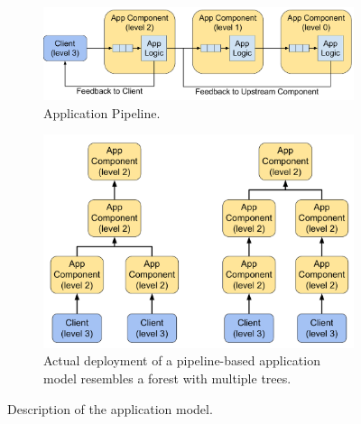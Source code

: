 \begin{figure}[ht]
\centering
\begin{subfigure}{.48\columnwidth}
  \centering
    \includegraphics[width=\columnwidth]{figures/oneedge/app_pipeline.pdf}
    \caption{Application Pipeline.}
    \label{fig:app_pipeline}
\end{subfigure}
\begin{subfigure}{.48\columnwidth}
  \centering
    \includegraphics[width=\columnwidth]{figures/oneedge/pipeline_tree.pdf}
    \caption{Actual deployment of a pipeline-based application model resembles a forest with multiple trees.}
    \label{fig:pipeline_tree}
\end{subfigure}
\caption{Description of the application model.}
\label{fig:app_model}
\end{figure}

